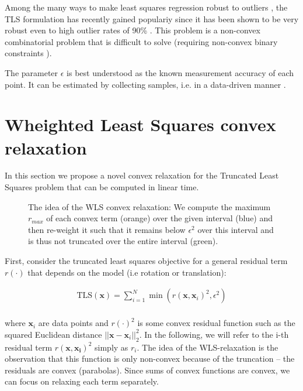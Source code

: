Among the many ways to make least squares regression robust to outliers \cite[Ch. 3]{elements-of-stats-learning-book}, the TLS formulation has recently gained populariy \cite{Yang20tro-teaser, 9785843, NIPS2017_9f53d83e, doi:10.1080/10618600.2017.1390471, NIPS2010_01882513} since it has been shown to be very robust even to high outlier rates of 90\% \cite{Yang20tro-teaser}.
This problem is a non-convex combinatorial problem that is difficult to solve (requiring non-convex binary constraints \cite{5459398}).

The parameter $\epsilon$ is best understood as the known measurement accuracy of each point. It can be estimated by collecting samples, i.e. in a data-driven manner \cite[p.8]{Chin2017TheMC}.


\section{Wheighted Least Squares convex relaxation}

In this section we propose a novel convex relaxation for the Truncated Least Squares problem that can be computed in linear time.

\begin{figure}[!ht]
	\centering
	\caption{The idea of the WLS convex relaxation: We compute the maximum $r_{max}$ of each convex term (orange) over the given interval (blue) and then re-weight it such that it remains below $\epsilon^2$ over this interval and is thus not truncated over the entire interval (green).}
	\label{fig:wlsrelaxideawithrelax}
\end{figure}

First, consider the truncated least squares objective for a general residual term $r(\cdot)$ that depends on the model (i.e rotation or translation): 

\begin{equation}
	\label{eq:tls-scalar-for-wls}
	\begin{aligned}
		\text{TLS}(\mathbf{x}) = \sum_{i=1}^{N} \min \left(r(\mathbf{x}, \mathbf{x}_i)^2, \epsilon^2 \right)\\
	\end{aligned}
\end{equation}

where $\mathbf{x}_i$ are data points and $r(\cdot)^2$ is some convex residual function such as the squared Euclidean distance $||\mathbf{x} - \mathbf{x}_i||_2^2$. In the following, we will refer to the i-th residual term $r(\mathbf{x}, \mathbf{x_i})^2$ simply as $r_i$.
The idea of the WLS-relaxation is the observation that this function is only non-convex because of the truncation -- the residuals are convex (parabolas). Since sums of convex functions are convex, we can focus on relaxing each term separately.

